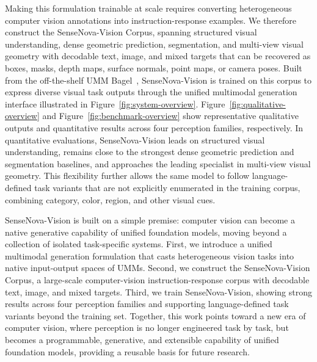 Making this formulation trainable at scale requires converting heterogeneous computer vision annotations into instruction-response examples.
We therefore construct the SenseNova-Vision Corpus, spanning structured visual understanding, dense geometric prediction, segmentation, and multi-view visual geometry with decodable text, image, and mixed targets that can be recovered as boxes, masks, depth maps, surface normals, point maps, or camera poses.
Built from the off-the-shelf UMM Bagel~\cite{bagel}, SenseNova-Vision is trained on this corpus to express diverse visual task outputs through the unified multimodal generation interface illustrated in Figure~\ref{fig:system-overview}.
Figure~\ref{fig:qualitative-overview} and Figure~\ref{fig:benchmark-overview} show representative qualitative outputs and quantitative results across four perception families, respectively.
In quantitative evaluations, SenseNova-Vision leads on structured visual understanding, remains close to the strongest dense geometric prediction and segmentation baselines, and approaches the leading specialist in multi-view visual geometry.
This flexibility further allows the same model to follow language-defined task variants that are not explicitly enumerated in the training corpus, combining category, color, region, and other visual cues.

SenseNova-Vision is built on a simple premise: computer vision can become a native generative capability of unified foundation models, moving beyond a collection of isolated task-specific systems.
First, we introduce a unified multimodal generation formulation that casts heterogeneous vision tasks into native input-output spaces of UMMs.
Second, we construct the SenseNova-Vision Corpus, a large-scale computer-vision instruction-response corpus with decodable text, image, and mixed targets.
Third, we train SenseNova-Vision, showing strong results across four perception families and supporting language-defined task variants beyond the training set.
Together, this work points toward a new era of computer vision, where perception is no longer engineered task by task, but becomes a programmable, generative, and extensible capability of unified foundation models, providing a reusable basis for future research.

\FloatBarrier
